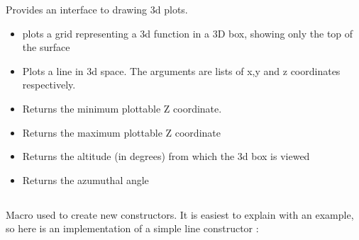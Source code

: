 \documentclass{article}
\begin{document}
{{{{{Provides an interface to drawing 3d plots. 

\begin{itemize}
\item 
{}

plots a grid representing a 3d function in a 3D box, showing only the top of the surface

\item 
{}

Plots a line in 3d space. The arguments are lists of x,y and z coordinates respectively.


\item 
{}


Returns the minimum plottable Z coordinate. 


\item 
{}


Returns the maximum plottable Z coordinate


\item 
{}


Returns the altitude (in degrees) from which the 3d box is viewed


\item 
{}


Returns the azumuthal angle


\end{itemize}

\label{define-plot-type}
\subsection{}


Macro used to create new constructors. It is easiest to explain with  an example, 
so here is an implementation of a simple line constructor :
\begin{schemedisplay}


\end{schemedisplay}}}}}}
\end{document}
